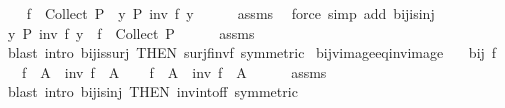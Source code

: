 \begin{isabellebody}
%
\isadelimproof
%
\endisadelimproof
%
\isatagproof
{}\isamarkupfalse%
\isanewline
\ \ \isamarkupfalse%
\ {\isachardoublequoteopen}f\ {\isacharbackquote}{\kern0pt}\ Collect\ P\ {\isasymsubseteq}\ {\isacharbraceleft}{\kern0pt}y{\isachardot}{\kern0pt}\ P\ {\isacharparenleft}{\kern0pt}inv\ f\ y{\isacharparenright}{\kern0pt}{\isacharbraceright}{\kern0pt}{\isachardoublequoteclose}\isanewline
\ \ \ \ \isamarkupfalse%
\ assms\ \isamarkupfalse%
\ {\isacharparenleft}{\kern0pt}force\ simp\ add{\isacharcolon}{\kern0pt}\ bij{\isacharunderscore}{\kern0pt}is{\isacharunderscore}{\kern0pt}inj{\isacharparenright}{\kern0pt}\isanewline
\ \ \isamarkupfalse%
\ {\isachardoublequoteopen}{\isacharbraceleft}{\kern0pt}y{\isachardot}{\kern0pt}\ P\ {\isacharparenleft}{\kern0pt}inv\ f\ y{\isacharparenright}{\kern0pt}{\isacharbraceright}{\kern0pt}\ {\isasymsubseteq}\ f\ {\isacharbackquote}{\kern0pt}\ Collect\ P{\isachardoublequoteclose}\isanewline
\ \ \ \ \isamarkupfalse%
\ assms\ \isamarkupfalse%
\ {\isacharparenleft}{\kern0pt}blast\ intro{\isacharcolon}{\kern0pt}\ bij{\isacharunderscore}{\kern0pt}is{\isacharunderscore}{\kern0pt}surj\ {\isacharbrackleft}{\kern0pt}THEN\ surj{\isacharunderscore}{\kern0pt}f{\isacharunderscore}{\kern0pt}inv{\isacharunderscore}{\kern0pt}f{\isacharcomma}{\kern0pt}\ symmetric{\isacharbrackright}{\kern0pt}{\isacharparenright}{\kern0pt}\isanewline
{}\isamarkupfalse%
%
\endisatagproof
{\isafoldproof}%
%
\isadelimproof
\isanewline
%
\endisadelimproof
\isanewline
{}\isamarkupfalse%
\ bij{\isacharunderscore}{\kern0pt}vimage{\isacharunderscore}{\kern0pt}eq{\isacharunderscore}{\kern0pt}inv{\isacharunderscore}{\kern0pt}image{\isacharcolon}{\kern0pt}\isanewline
\ \ \ {\isachardoublequoteopen}bij\ f{\isachardoublequoteclose}\isanewline
\ \ \ {\isachardoublequoteopen}f\ {\isacharminus}{\kern0pt}{\isacharbackquote}{\kern0pt}\ A\ {\isacharequal}{\kern0pt}\ inv\ f\ {\isacharbackquote}{\kern0pt}\ A{\isachardoublequoteclose}\isanewline
%
\isadelimproof
%
\endisadelimproof
%
\isatagproof
{}\isamarkupfalse%
\isanewline
\ \ \isamarkupfalse%
\ {\isachardoublequoteopen}f\ {\isacharminus}{\kern0pt}{\isacharbackquote}{\kern0pt}\ A\ {\isasymsubseteq}\ inv\ f\ {\isacharbackquote}{\kern0pt}\ A{\isachardoublequoteclose}\isanewline
\ \ \ \ \isamarkupfalse%
\ assms\ \isamarkupfalse%
\ {\isacharparenleft}{\kern0pt}blast\ intro{\isacharcolon}{\kern0pt}\ bij{\isacharunderscore}{\kern0pt}is{\isacharunderscore}{\kern0pt}inj\ {\isacharbrackleft}{\kern0pt}THEN\ inv{\isacharunderscore}{\kern0pt}into{\isacharunderscore}{\kern0pt}f{\isacharunderscore}{\kern0pt}f{\isacharcomma}{\kern0pt}\ symmetric{\isacharbrackright}{\kern0pt}{\isacharparenright}{\kern0pt}\isanewline

\end{isabellebody}
